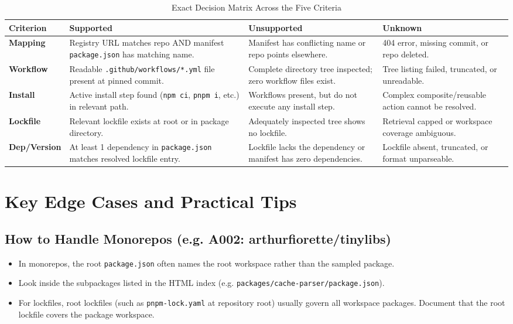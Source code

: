 \documentclass[11pt,a4paper]{article}
\begin{document}
\begin{table}[ht]
\centering
\small
\begin{tabularx}{\linewidth}{lXXX}
\toprule
\textbf{Criterion} & \textbf{Supported} & \textbf{Unsupported} & \textbf{Unknown} \\
\midrule
\textbf{Mapping} & Registry URL matches repo AND manifest \nolinkurl{package.json} has matching name. & Manifest has conflicting name or repo points elsewhere. & 404 error, missing commit, or repo deleted. \\
\addlinespace
\textbf{Workflow} & Readable \nolinkurl{.github/workflows/*.yml} file present at pinned commit. & Complete directory tree inspected; zero workflow files exist. & Tree listing failed, truncated, or unreadable. \\
\addlinespace
\textbf{Install} & Active install step found (\nolinkurl{npm ci}, \nolinkurl{pnpm i}, etc.) in relevant path. & Workflows present, but do not execute any install step. & Complex composite/reusable action cannot be resolved. \\
\addlinespace
\textbf{Lockfile} & Relevant lockfile exists at root or in package directory. & Adequately inspected tree shows no lockfile. & Retrieval capped or workspace coverage ambiguous. \\
\addlinespace
\textbf{Dep/Version} & At least 1 dependency in \nolinkurl{package.json} matches resolved lockfile entry. & Lockfile lacks the dependency or manifest has zero dependencies. & Lockfile absent, truncated, or format unparseable. \\
\bottomrule
\end{tabularx}
\caption{Exact Decision Matrix Across the Five Criteria}
\end{table}

\clearpage
\section{Key Edge Cases and Practical Tips}

\subsection{How to Handle Monorepos (e.g. A002: arthurfiorette/tinylibs)}
\begin{itemize}
  \item In monorepos, the root \nolinkurl{package.json} often names the root workspace rather than the sampled package.
  \item Look inside the subpackages listed in the HTML index (e.g. \nolinkurl{packages/cache-parser/package.json}).
  \item For lockfiles, root lockfiles (such as \nolinkurl{pnpm-lock.yaml} at repository root) usually govern all workspace packages. Document that the root lockfile covers the package workspace.
\end{itemize}
\end{document}

